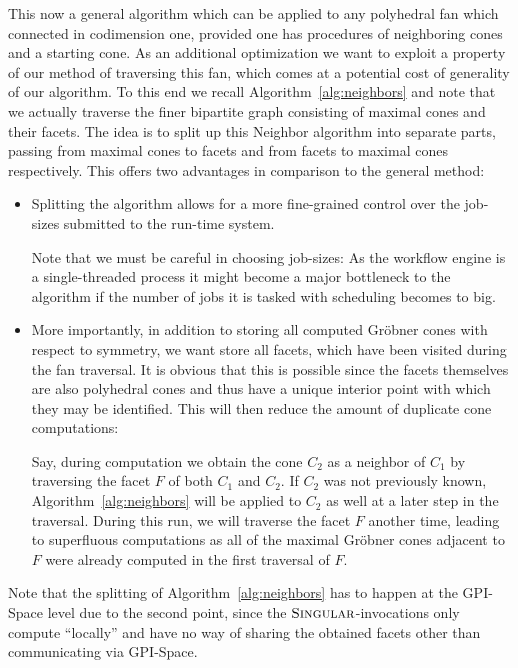 \documentclass[
  paper=a4,
  titlepage,
  bibliography=totoc,
  pagesize=pdftex
]{scrartcl}
\numberwithin{figure}{section}
\numberwithin{equation}{section}
\numberwithin{table}{section}
\theoremstyle{definition}
\numberwithin{definition}{section}
\begin{document}
This now a general algorithm which can be applied to any polyhedral fan which connected in
codimension one, provided one has procedures of neighboring cones and a starting cone. As
an additional optimization we want to exploit a property of our method of traversing this
fan, which comes at a potential cost of generality of our algorithm. To this end we recall
Algorithm~\ref{alg:neighbors} and note that we actually traverse the finer bipartite graph
consisting of maximal cones and their facets. The idea is to split up this Neighbor
algorithm into separate parts, passing from maximal cones to facets and from facets to
maximal cones respectively. This offers two advantages in comparison to the general
method:
\begin{itemize}
  \item Splitting the algorithm allows for a more fine-grained control over the job-sizes
    submitted to the run-time system. 

    Note that we must be careful in choosing job-sizes: As the workflow engine is a
    single-threaded process it might become a major bottleneck to the algorithm if the
    number of jobs it is tasked with scheduling becomes to big.
  \item More importantly, in addition to storing all computed Gröbner cones with respect
    to symmetry, we want store all facets, which have been visited during the fan
    traversal. It is obvious that this is possible since the facets themselves are also
    polyhedral cones and thus have a unique interior point with which they may be
    identified. This will then reduce the amount of duplicate cone computations:

    Say, during computation we obtain the cone $C_2$ as a neighbor of $C_1$ by traversing
    the facet $F$ of both $C_1$ and $C_2$. If $C_2$ was not previously known,
    Algorithm~\ref{alg:neighbors} will be applied to $C_2$ as well at a later step in the
    traversal. During this run, we will traverse the facet $F$ another time, leading to
    superfluous computations as all of the maximal Gröbner cones adjacent to $F$ were
    already computed in the first traversal of $F$.
\end{itemize}
Note that the splitting of Algorithm~\ref{alg:neighbors} has to happen at the GPI-Space
level due to the second point, since the $\textsc{Singular}$-invocations only compute
\enquote{locally} and have no way of sharing the obtained facets other than communicating
via GPI-Space.
\end{document}
